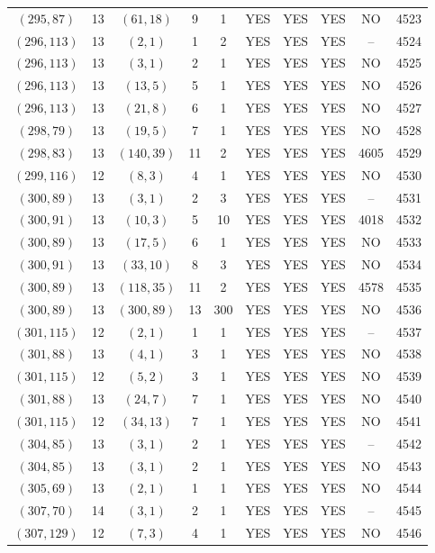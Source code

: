 \begin{longtable}{|c|c|c|c|c|c|c|c|c|c|}
$(295, 87)$ & 13 & $(61, 18)$ & 9 & 1 & YES & YES & YES & NO & 4523\\
$(296, 113)$ & 13 & $(2, 1)$ & 1 & 2 & YES & YES & YES & -- & 4524\\
$(296, 113)$ & 13 & $(3, 1)$ & 2 & 1 & YES & YES & YES & NO & 4525\\
$(296, 113)$ & 13 & $(13, 5)$ & 5 & 1 & YES & YES & YES & NO & 4526\\
$(296, 113)$ & 13 & $(21, 8)$ & 6 & 1 & YES & YES & YES & NO & 4527\\
$(298, 79)$ & 13 & $(19, 5)$ & 7 & 1 & YES & YES & YES & NO & 4528\\
$(298, 83)$ & 13 & $(140, 39)$ & 11 & 2 & YES & YES & YES & 4605 & 4529\\
$(299, 116)$ & 12 & $(8, 3)$ & 4 & 1 & YES & YES & YES & NO & 4530\\
$(300, 89)$ & 13 & $(3, 1)$ & 2 & 3 & YES & YES & YES & -- & 4531\\
$(300, 91)$ & 13 & $(10, 3)$ & 5 & 10 & YES & YES & YES & 4018 & 4532\\
$(300, 89)$ & 13 & $(17, 5)$ & 6 & 1 & YES & YES & YES & NO & 4533\\
$(300, 91)$ & 13 & $(33, 10)$ & 8 & 3 & YES & YES & YES & NO & 4534\\
$(300, 89)$ & 13 & $(118, 35)$ & 11 & 2 & YES & YES & YES & 4578 & 4535\\
$(300, 89)$ & 13 & $(300, 89)$ & 13 & 300 & YES & YES & YES & NO & 4536\\
$(301, 115)$ & 12 & $(2, 1)$ & 1 & 1 & YES & YES & YES & -- & 4537\\
$(301, 88)$ & 13 & $(4, 1)$ & 3 & 1 & YES & YES & YES & NO & 4538\\
$(301, 115)$ & 12 & $(5, 2)$ & 3 & 1 & YES & YES & YES & NO & 4539\\
$(301, 88)$ & 13 & $(24, 7)$ & 7 & 1 & YES & YES & YES & NO & 4540\\
$(301, 115)$ & 12 & $(34, 13)$ & 7 & 1 & YES & YES & YES & NO & 4541\\
$(304, 85)$ & 13 & $(3, 1)$ & 2 & 1 & YES & YES & YES & -- & 4542\\
$(304, 85)$ & 13 & $(3, 1)$ & 2 & 1 & YES & YES & YES & NO & 4543\\
$(305, 69)$ & 13 & $(2, 1)$ & 1 & 1 & YES & YES & YES & NO & 4544\\
$(307, 70)$ & 14 & $(3, 1)$ & 2 & 1 & YES & YES & YES & -- & 4545\\
$(307, 129)$ & 12 & $(7, 3)$ & 4 & 1 & YES & YES & YES & NO & 4546\\

\end{longtable}
